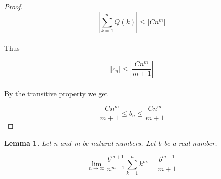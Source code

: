 \documentclass{article}
\newtheorem{lemma}{Lemma}
\begin{document}
\begin{proof}
\begin{equation*}
\left| \sum_{k=1}^{n} Q(k) \right| \le \left| Cn^{m} \right|
\end{equation*}
\\
Thus

\begin{equation*}
|c_{n}| \le \left| \frac{Cn^{m}}{m+1} \right|
\end{equation*}
\\
By the transitive property we get

\begin{equation*}
\frac{-Cn^{m}}{m+1} \le b_{n} \le \frac{Cn^{m}}{m+1} 
\end{equation*}

\end{proof}

\begin{lemma}
Let n and m be natural numbers. Let b be a real number.

\begin{equation*}
\lim_{n \to \infty} \frac{b^{m+1}}{n^{m+1}} \sum_{k=1}^{n} k^{m} = \displaystyle \frac{b^{m+1}}{m+1}
\end{equation*}
\end{lemma}
\end{document}
